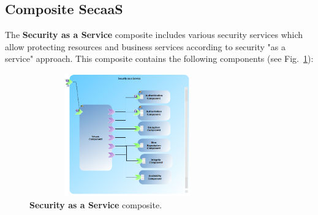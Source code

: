 \documentclass[runningheads,a4paper]{llncs}
\begin{document}
\subsection{Composite SecaaS}

The \textbf{Security as a Service} composite includes various security services which allow protecting resources and business services according to security "as a service" approach. This composite contains the following components (see Fig.~\ref{fig:SecaaS}):
\begin{figure}[ht]  
\centering
\includegraphics[height=150pt, width=240pt]{Secaas.PNG}
\caption{\textbf{Security as a Service} composite.}
\label{fig:SecaaS}
\end{figure}
\end{document}
